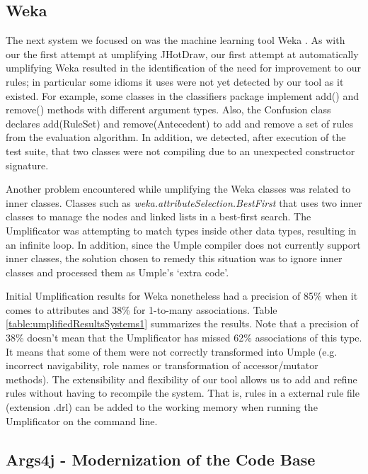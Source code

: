 \subsection{Weka}
 
The next system we focused on was the machine learning tool Weka \cite{Weka}. As with our the first attempt at umplifying JHotDraw, our first attempt at automatically umplifying Weka resulted in the identification of the need for improvement to our rules; in particular some idioms it uses were not yet detected by our tool as it existed. For example, some classes in the classifiers package implement add() and remove() methods with different argument types. Also, the Confusion class declares add(RuleSet) and remove(Antecedent) to add and remove a set of rules from the evaluation algorithm. In addition, we detected, after execution of the test suite, that two classes were not compiling due to an unexpected constructor signature.

Another problem encountered while umplifying the Weka classes was related to inner classes. Classes such as \textit{weka.attributeSelection.BestFirst} that uses two inner classes to manage the nodes and linked lists in a best-first search. The Umplificator was attempting to match types inside other data types, resulting in an infinite loop. In addition, since the Umple compiler does not currently support inner classes, the solution chosen to remedy this situation was to ignore inner classes and processed them as Umple's `extra code'. 

Initial Umplification results for Weka nonetheless had a precision of 85\% when it comes to attributes and 38\% for 1-to-many associations. Table \ref{table:umplifiedResultsSystems1} summarizes the results. Note that a precision of 38\% doesn't mean that the Umplificator has missed 62\% associations of this type. It means that some of them were not correctly transformed into Umple (e.g. incorrect navigability, role names or transformation of accessor/mutator methods). The extensibility and flexibility of our tool allows us to add and refine rules without having to recompile the system. That is, rules in a external rule file (extension .drl) can be added to the working memory when running the Umplificator on the command line.

\subsection{Args4j - Modernization of the Code Base}

